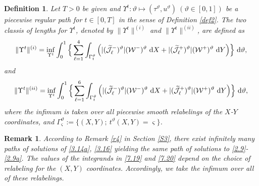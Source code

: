 \documentclass[11pt,reqno]{article}
\newtheorem{defn}{Definition}
\newtheorem{rem}{Remark}
\numberwithin{equation}{section}
\begin{document}
\begin{defn}\label{def3}
Let $T>0$ be given and $\Upsilon^t: \vartheta\mapsto (\tau^\vartheta, u^\vartheta)\ (\vartheta\in[0,1])$ be a piecewise regular path for $t\in[0, T]$ in the sense of Definition \ref{def2}. The two classis of lengths for $\Upsilon^t$, denoted by $\|\Upsilon^t\|^{(i)}$ and $\|\Upsilon^t\|^{(ii)}$, are defined as
\begin{align}\label{7.19}
\begin{split}
\|\Upsilon^t\|^{(i)}=\inf_{\Upsilon^t}\int_{0}^1 \Big\{\sum_{\ell=1}^4 \int_{\Gamma_{t}^\vartheta}\Big(|(\widetilde{\mathcal{J}}_{\ell}^-)^\vartheta|(\mathcal{W}^-)^\vartheta\ {\rm d}X +|(\widetilde{\mathcal{J}}_{\ell}^+)^\vartheta|(\mathcal{W}^+)^\vartheta\ {\rm d}Y\Big)\Big\}\ {\rm d}\vartheta,
\end{split}
\end{align}
and
\begin{align}\label{7.20}
\begin{split}
\|\Upsilon^t\|^{(ii)}=\inf_{\Upsilon^t}\int_{0}^1 \Big\{\sum_{\ell=1}^6 \int_{\Gamma_{t}^\vartheta}\Big(|(\widetilde{\mathcal{J}}_{\ell}^-)^\vartheta|(\mathcal{W}^-)^\vartheta\ {\rm d}X +|(\widetilde{\mathcal{J}}_{\ell}^+)^\vartheta|(\mathcal{W}^+)^\vartheta\ {\rm d}Y\Big)\Big\}\ {\rm d}\vartheta,
\end{split}
\end{align}
where the infimum is taken over all piecewise smooth relabelings of the $X$-$Y$ coordinates, and $\Gamma_{\varsigma}^\vartheta:=\{(X,Y);\ t^\vartheta(X,Y)=\varsigma\}$.
\end{defn}
\begin{rem}\label{r5}
According to Remark \ref{r4} in Section \ref{S3}, there exist infinitely many paths of solutions of \eqref{3.14a}, \eqref{3.16} yielding the same path of solutions to \eqref{2.9}-\eqref{2.9a}. The values of the  integrands in \eqref{7.19} and \eqref{7.20} depend on the choice of relabeling for the $(X,Y)$ coordinates. Accordingly, we take the infimum over all of these relabelings.
\end{rem}
\end{document}
